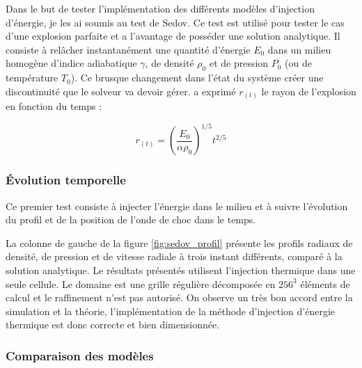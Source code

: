 Dans le but de tester l'implémentation des différents modèles d'injection d'énergie, je les ai soumis au test de Sedov.
Ce test est utilisé pour tester le cas d'une explosion parfaite et a l'avantage de posséder une solution analytique.
Il consiste à relâcher instantanément une quantité d'énergie $E_0$ dans un milieu homogène d'indice adiabatique $\gamma$, de densité $\rho_0$ et de pression $P_0$ (ou de température $T_0$).
Ce brusque changement dans l'état du système créer une discontinuité que le solveur va devoir gérer.
\cite{sedov_similarity_1959} a exprimé $r_{(t)}$ le rayon de l'explosion en fonction du temps  : 

\begin{equation}
r_{(t)}=\left( \frac{E_0}{\alpha \rho_0 }\right)^{1/5} t^{2/5}
\end{equation}


\subsubsection{Évolution temporelle }


Ce premier test consiste à injecter l'énergie dans le milieu et à suivre l'évolution du profil et de la position de l'onde de choc dans le temps.

La colonne de gauche de la figure \ref{fig:sedov_profil} présente les profils radiaux de densité, de pression et de vitesse radiale à trois instant différents, comparé à la solution analytique.
Le résultats présentés utilisent l'injection thermique dans une seule cellule.
Le domaine est une grille régulière décomposée en $256^3$ éléments de calcul et le raffinement n'est pas autorisé.
On observe un très bon accord entre la simulation et la théorie, l'implémentation de la méthode d'injection d'énergie thermique est donc correcte et bien dimensionnée.

\subsubsection{Comparaison des modèles}

